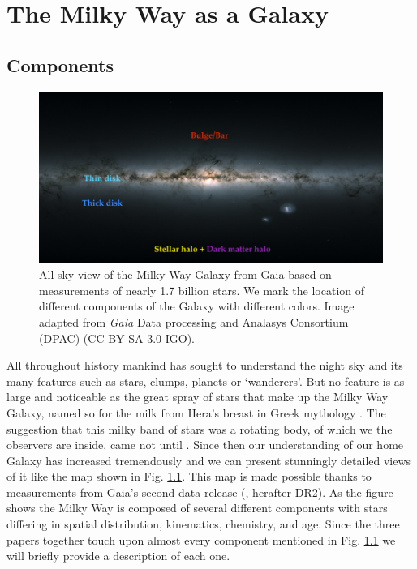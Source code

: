 \chapter{The Milky Way as a Galaxy}\label{chap:milkyway}
\section{Components}\label{sec:components}
\begin{figure}[t]
    \centering
    \includegraphics[width=1\textwidth]{images/gaiasky.png}
    \caption{All-sky view of the Milky Way Galaxy from Gaia based on measurements of nearly 1.7 billion stars. We mark the location of different components of the Galaxy with different colors. Image adapted from \textit{Gaia} Data processing and Analasys Consortium (DPAC) (CC BY-SA 3.0 IGO).} %
    \label{fig:gaiasky}
\end{figure}
All throughout history mankind has sought to understand the night sky and its many features such as stars, clumps, planets or `wanderers'. But no feature is as large and noticeable as the great spray of stars that make up the Milky Way Galaxy, named so for the milk from Hera's breast in Greek mythology \citep{leeming:98}. The suggestion that this milky band of stars was a rotating body, of which we the observers are inside, came not until \cite{wright:1750}. Since then our understanding of our home Galaxy has increased tremendously and we can present stunningly detailed views of it like the map shown in Fig. \ref{fig:gaiasky}. This map is made possible thanks to measurements from Gaia's second data release (\citealt{dr2},  herafter DR2). As the figure shows the Milky Way is composed of several different components with stars differing in spatial distribution, kinematics, chemistry, and age. Since the three papers together touch upon almost every component mentioned in Fig. \ref{fig:gaiasky} we will briefly provide a description of each one.

